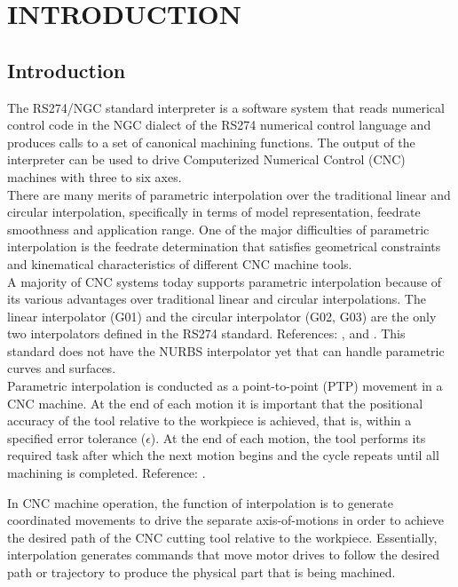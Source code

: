 \chapter{INTRODUCTION}

\section{Introduction}

The RS274/NGC standard interpreter is a software system that reads numerical control code in the NGC dialect of the RS274 numerical control language and produces calls to a set of canonical machining functions. The output of the interpreter can be used to drive Computerized Numerical Control (CNC) machines with three to six axes. \\

There are many merits of parametric interpolation over the traditional linear and circular interpolation, specifically in terms of model representation, feedrate smoothness and application range. One of the major difficulties of parametric interpolation is the feedrate determination that satisfies geometrical constraints and kinematical characteristics of different CNC machine tools.\\

A majority of CNC systems today supports parametric interpolation because of its various advantages over traditional linear and circular interpolations. The linear interpolator (G01) and the circular interpolator (G02, G03) are the only two interpolators defined in the RS274 standard. References: \cite{Suh-etal:2008}, and \cite{Kramer-etal:2000}. This standard does not have the NURBS interpolator yet that can handle parametric curves and surfaces.\\

Parametric interpolation is conducted as a point-to-point (PTP) movement in a CNC machine. At the end of each motion it is important that the positional accuracy of the tool relative to the workpiece is achieved, that is, within a specified error tolerance ($\epsilon$). At the end of each motion, the tool performs its required task after which the next motion begins and the cycle repeats until all machining is completed. Reference: \cite{Zhong-etal:2018}.

\clearpage
\pagebreak 

In CNC machine operation, the function of interpolation is to generate coordinated movements to drive the separate axis-of-motions in order to achieve the desired path of the CNC cutting tool relative to the workpiece. Essentially, interpolation generates commands that move motor drives to follow the desired path or trajectory to produce the physical part that is being machined.\\

